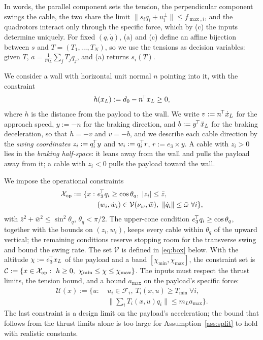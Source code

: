 In words, the parallel component sets the tension, the perpendicular component swings the cable, the two share the limit $\|s_iq_i+u_i^\perp\|\le f_{\max,i}$, and the quadrotors interact only through the specific force, which by (c) the inputs determine uniquely. For fixed $(q,\dot q)$, (a) and (c) define an affine bijection between $s$ and $T=(T_1,\dots,T_N)$, so we use the tensions as decision variables: given $T$, $a=\frac{1}{m_L}\sum_jT_jq_j$, and (a) returns $s_i(T)$.

We consider a wall with horizontal unit normal $n$ pointing into it, with the constraint
\begin{equation}
h(x_L):=d_0-n^{\!\top} x_L\ge 0,
\label{eq:h}
\end{equation}
where $h$ is the distance from the payload to the wall. We write $v:=n^{\!\top}\dot x_L$ for the approach speed, $y:=-n$ for the braking direction, and $b:=y^{\!\top}\ddot x_L$ for the braking deceleration, so that $\dot h=-v$ and $\dot v=-b$, and we describe each cable direction by the \emph{swing coordinates} $z_i:=q_i^{\!\top} y$ and $w_i:=q_i^{\!\top} r$, $r:=e_3\times y$. A cable with $z_i>0$ lies in the \emph{braking half-space}: it leans away from the wall and pulls the payload away from it; a cable with $z_i<0$ pulls the payload toward the wall.

We impose the operational constraints
\begin{equation}
\begin{split}
\mathcal{X}_{\mathrm{op}}:=\{x:\ &e_3^{\!\top} q_i\ge\cos\theta_q,\ |z_i|\le\bar z,\\ &(w_i,\dot w_i)\in\mathcal V(\nu_w,\bar w),\ \|\dot q_i\|\le\bar\omega\ \forall i\},
\end{split}
\label{eq:Xop}
\end{equation}
with $\bar z^2+\bar w^2\le\sin^2\theta_q$, $\theta_q<\pi/2$. The upper-cone condition $e_3^{\!\top} q_i\ge\cos\theta_q$, together with the bounds on $(z_i,w_i)$, keeps every cable within $\theta_q$ of the upward vertical; the remaining conditions reserve stopping room for the transverse swing and bound the swing rate. The set $\mathcal V$ is defined in \eqref{eq:box} below. With the altitude $\chi:=e_3^{\!\top} x_L$ of the payload and a band $[\chi_{\min},\chi_{\max}]$, the constraint set is $\mathcal{C}:=\{x\in\Xop:\ h\ge 0,\ \chi_{\min}\le\chi\le\chi_{\max}\}$. The inputs must respect the thrust limits, the tension bound, and a bound $a_{\max}$ on the payload's specific force:
\begin{equation}
\begin{split}
\mathcal{U}(x):=\{u:\ &u_i\in\mathcal{F}_i,\ T_i(x,u)\ge T_{\min}\ \forall i,\\ &\textstyle\|\sum_iT_i(x,u)q_i\|\le m_La_{\max}\}.
\end{split}
\label{eq:U}
\end{equation}
The last constraint is a design limit on the payload's acceleration; the bound that follows from the thrust limits alone is too large for Assumption~\ref{ass:split} to hold with realistic constants.

